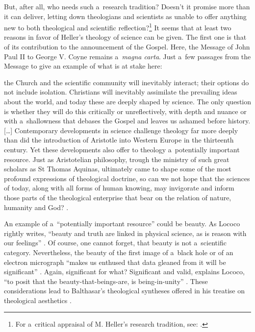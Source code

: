 But, after all, who needs such a~research tradition? Doesn't it promise more than it can deliver, letting down theologians and scientists as unable to offer anything new to both theological and scientific reflection?\footnote{For a~critical appraisal of M. Heller's research tradition, see: 
\parencite[][]{polak_teologia_2016}.%
} It seems that at least two reasons in favor of Heller's theology of science can be given. The first one is that of its contribution to the announcement of the Gospel. Here, the Message of John Paul II to George V. Coyne remains a~\textit{magna carta}. Just a~few passages from the Message to give an example of what is at stake here:



the Church and the scientific community will inevitably interact; their options do not include isolation. Christians will inevitably assimilate the prevailing ideas about the world, and today these are deeply shaped by science. The only question is whether they will do this critically or unreflectively, with depth and nuance or with a~shallowness that debases the Gospel and leaves us ashamed before history. […] Contemporary developments in science challenge theology far more deeply than did the introduction of Aristotle into Western Europe in the thirteenth century. Yet these developments also offer to theology a~potentially important resource. Just as Aristotelian philosophy, trough the ministry of such great scholars as St Thomas Aquinas, ultimately came to shape some of the most profound expressions of theological doctrine, so can we not hope that the sciences of today, along with all forms of human knowing, may invigorate and inform those parts of the theological enterprise that bear on the relation of nature, humanity and God? 
\parencite[][]{}.%




An example of a~``potentially important resource'' could be beauty. As Lococo rightly writes, ``beauty and truth are linked in physical science, as is reason with our feelings'' 
\parencite[][p.61]{lococo_life_2021}. %
 Of course, one cannot forget, that beauty is not a~scientific category. Nevertheless, the beauty of the first image of a~black hole 
\parencite[][]{szybka_remarks_2020} %
 or of an electron micrograph ``makes us enthused that data gleaned from it will be significant'' 
\parencite[][p.61]{lococo_life_2021}. %
 Again, significant for what? Significant and valid, explains Lococo, ``to posit that the beauty-that-beings-are, is being-in-unity'' 
\parencite[][p.62]{lococo_life_2021}. %
 These considerations lead to Balthasar's theological syntheses offered in his treatise on theological aesthetics 
\parencite[][]{balthasar_glory_2009}.%




